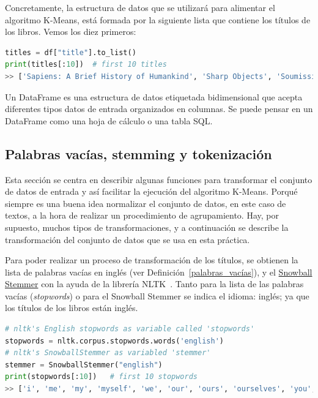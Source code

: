 \documentclass{uimppracticas}
\begin{document}
Concretamente, la estructura de datos que se utilizará para alimentar el algoritmo K-Means, está formada por la siguiente lista que contiene los títulos de los libros. Vemos los diez primeros:

\begin{lstlisting}[language=python]
titles = df["title"].to_list()
print(titles[:10])  # first 10 titles
>> ['Sapiens: A Brief History of Humankind', 'Sharp Objects', 'Soumission', 'Tipping the Velvet', 'A Light in the Attic', "It's Only the Himalayas", 'Libertarianism for Beginners', 'Mesaerion: The Best Science Fiction Stories 1800-1849', 'Olio', 'Our Band Could Be Your Life: Scenes from the American Indie Underground, 1981-1991']
\end{lstlisting}

\begin{definition}\label{dataframe}
Un DataFrame es una estructura de datos etiquetada bidimensional que acepta diferentes tipos datos de entrada organizados en columnas. Se puede pensar en un DataFrame como una hoja de cálculo o una tabla SQL.
\end{definition}

\subsection{Palabras vacías, stemming y tokenización}\label{stem_token}

Esta sección se centra en describir algunas funciones para transformar el conjunto de datos de entrada y así facilitar la ejecución del algoritmo K-Means. Porqué siempre es una buena idea normalizar el conjunto de datos, en este caso de textos, a la hora de realizar un procedimiento de agrupamiento. Hay, por supuesto, muchos tipos de transformaciones, y a continuación se describe la transformación del conjunto de datos que se usa en esta práctica.

Para poder realizar un proceso de transformación de los títulos, se obtienen la lista de palabras vacías en inglés (ver Definición~\ref{palabras_vacías}), y el \href{https://www.nltk.org/_modules/nltk/stem/snowball.html}{Snowball Stemmer} con la ayuda de la librería NLTK~\cite{bird2009natural}. Tanto para la lista de las palabras vacías (\textit{stopwords}) o para el Snowball Stemmer se indica el idioma: inglés; ya que los títulos de los libros están inglés. 

\begin{lstlisting}[language=python]
# nltk's English stopwords as variable called 'stopwords'	
stopwords = nltk.corpus.stopwords.words('english')  
# nltk's SnowballStemmer as variabled 'stemmer'
stemmer = SnowballStemmer("english")
print(stopwords[:10])   # first 10 stopwords
>> ['i', 'me', 'my', 'myself', 'we', 'our', 'ours', 'ourselves', 'you', "you're"]    
\end{lstlisting}
\end{document}
